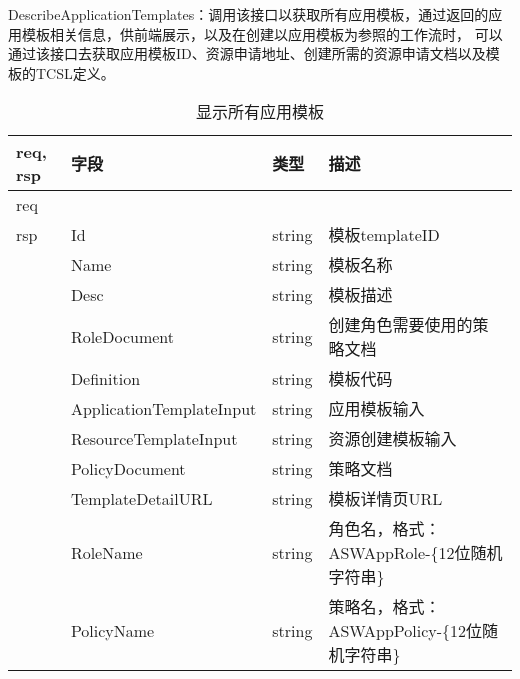 DescribeApplicationTemplates：调用该接口以获取所有应用模板，通过返回的应用模板相关信息，供前端展示，以及在创建以应用模板为参照的工作流时，
可以通过该接口去获取应用模板ID、资源申请地址、创建所需的资源申请文档以及模板的TCSL定义。
\begin{table}[H]
    \centering
    \caption{显示所有应用模板}
    \label{tab:design-interface-app-template}
    \begin{tabular}{llll}
        \toprule
        req, rsp   & 字段 & 类型 & 描述 \\
        \midrule
        req &&&\\ \hline
        rsp & Id & string & 模板templateID\\
        & Name & string & 模板名称\\
        & Desc & string & 模板描述\\
        & RoleDocument & string & 创建角色需要使用的策略文档\\
        & Definition & string & 模板代码\\
        & ApplicationTemplateInput & string & 应用模板输入\\
        & ResourceTemplateInput & string & 资源创建模板输入\\
        & PolicyDocument & string & 策略文档\\
        & TemplateDetailURL & string & 模板详情页URL\\
        & RoleName & string & 角色名，格式：ASWAppRole-\{12位随机字符串\}\\
        & PolicyName & string & 策略名，格式：ASWAppPolicy-\{12位随机字符串\}\\

        \bottomrule
    \end{tabular}
\end{table}


